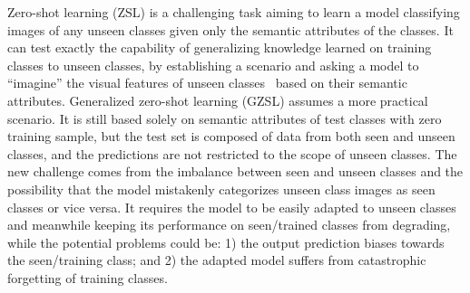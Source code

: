 \documentclass[letterpaper]{article} %
\begin{document}
Zero-shot learning (ZSL) is a challenging task aiming to learn a model classifying  images of any unseen classes given only the semantic attributes of the classes. It can test exactly the capability of generalizing knowledge learned on training classes to unseen classes, by establishing a scenario and asking a model to ``imagine'' the visual features of unseen classes~\cite{lampert2013attribute} based on their semantic attributes.
Generalized zero-shot learning (GZSL) assumes a more practical scenario. It is still based solely on semantic attributes of test classes with zero training sample, but the test set is composed of data from both seen and unseen classes, and the predictions are not restricted to the scope of unseen classes. The new challenge comes from the imbalance between seen and unseen classes and the possibility that the model mistakenly categorizes unseen class images as seen classes or vice versa.
It requires the model to be easily adapted to unseen classes and meanwhile keeping its performance on seen/trained classes from degrading, while the potential problems could be: 1) the output prediction biases towards the seen/training class; and 2) the adapted model suffers from catastrophic forgetting of training classes.


\end{document}
